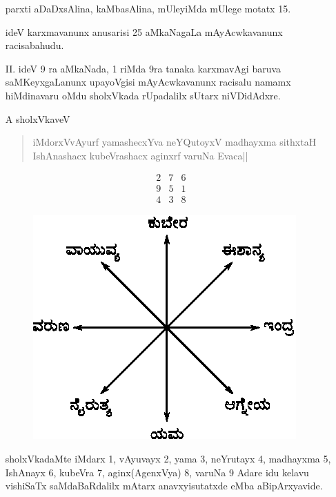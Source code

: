\begin{enumerate}
parxti aDaDxsAlina, kaMbasAlina, mUleyiMda mUlege motatx {\rm 15}.

ideV karxmavanunx anusarisi {\rm 25} aMkaNagaLa mAyAcwkavanunx racisabahudu.

\item[{\rm II.}] ideV {\rm 9} ra aMkaNada, {\rm 1} riMda {\rm 9}ra tanaka karxmavAgi baruva saMKeyxgaLanunx upayoVgisi mAyAcwkavanunx racisalu namamx hiMdinavaru oMdu sholxVkada rUpadalilx sUtarx niVDidAdxre.

A sholxVkaveV 
\begin{verse}
iMdorxVvAyurf yamashecxYva neYQutoyxV madhayxma sithxtaH\\ 
IshAnashacx kubeVrashacx aginxrf varuNa Evaca||
\end{verse}
$$
\begin{matrix}
2 & 7 & 6\\
9 & 5 & 1\\
4 & 3 & 8
\end{matrix}
$$

\begin{figure}[H]
\centering
\includegraphics[scale=.8]{src/figures/m_117.eps}
\end{figure}

sholxVkadaMte iMdarx {\rm 1}, vAyuvayx {\rm 2}, yama {\rm 3}, neYrutayx {\rm 4}, madhayxma {\rm 5}, IshAnayx {\rm 6}, kubeVra {\rm 7}, aginx(AgenxVya) {\rm 8}, varuNa {\rm 9} Adare idu kelavu vishiSaTx saMdaBaRdalilx mAtarx anavxyisutatxde eMba aBipArxyavide.


\end{enumerate}

